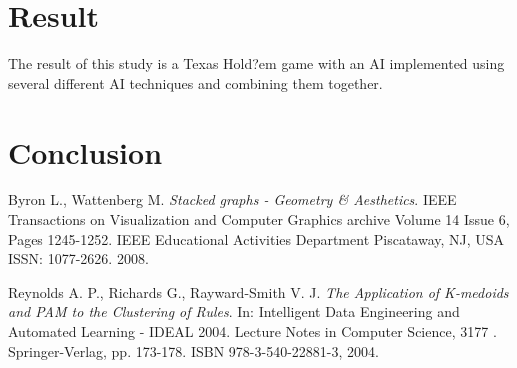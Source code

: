 \documentclass[journal]{vgtc}                %
\begin{document}
\section{Result}
The result of this study is a Texas Hold?em game with an AI implemented using several different AI techniques and combining them together. 

\section{Conclusion}



\begin{thebibliography}{9}

  Byron L., Wattenberg M.
  \emph{Stacked graphs - Geometry \& Aesthetics}.
  IEEE Transactions on Visualization and Computer Graphics archive
Volume 14 Issue 6,
Pages 1245-1252. IEEE Educational Activities Department Piscataway, NJ, USA
ISSN: 1077-2626.
  2008.

  Reynolds A. P., Richards G., Rayward-Smith V. J.
  \emph{The Application of K-medoids and PAM to the Clustering of Rules}.
  In: Intelligent Data Engineering and Automated Learning - IDEAL 2004. Lecture Notes in Computer Science, 3177 . Springer-Verlag, pp. 173-178. ISBN 978-3-540-22881-3,
  2004.

\end{thebibliography}
\end{document}
